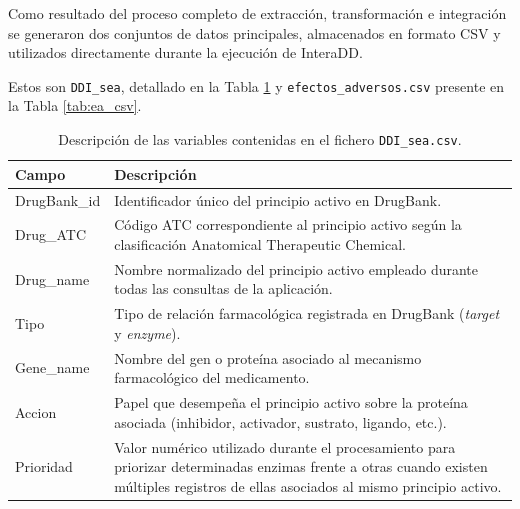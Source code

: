 Como resultado del proceso completo de extracción, transformación e integración se generaron dos conjuntos de datos principales, almacenados en formato CSV y utilizados directamente durante la ejecución de InteraDD.

Estos son \texttt{DDI\_sea}, detallado en la Tabla \ref{tab:ddi_csv} y \texttt{efectos\_adversos.csv} presente en la Tabla \ref{tab:ea_csv}.

\begin{table}[h]
\centering
\begin{tabularx}{\textwidth}{lX}
\toprule
\textbf{Campo} & \textbf{Descripción} \\
\midrule
DrugBank\_id & Identificador único del principio activo en DrugBank.\\

Drug\_ATC & Código ATC correspondiente al principio activo según la clasificación Anatomical Therapeutic Chemical.\\

Drug\_name & Nombre normalizado del principio activo empleado durante todas las consultas de la aplicación.\\

Tipo & Tipo de relación farmacológica registrada en DrugBank (\textit{target} y \textit{enzyme}).\\

Gene\_name & Nombre del gen o proteína asociado al mecanismo farmacológico del medicamento.\\

Accion & Papel que desempeña el principio activo sobre la proteína asociada (inhibidor, activador, sustrato, ligando, etc.).\\

Prioridad & Valor numérico utilizado durante el procesamiento para priorizar determinadas enzimas frente a otras cuando existen múltiples registros de ellas asociados al mismo principio activo.\\

\bottomrule
\end{tabularx}
\caption{Descripción de las variables contenidas en el fichero \texttt{DDI\_sea.csv}.}
\label{tab:ddi_csv}
\end{table}

